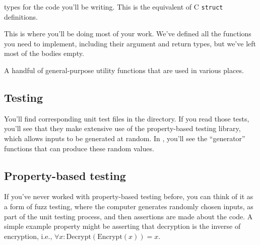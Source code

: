 \begin{description}
  types for the code you'll be writing. This is the
   equivalent
  of C {\tt struct} definitions. 
\item [\python{simple\_elections.py}\kotlin{SimpleElections.kt}] This is where you'll be doing most of
  your work. We've defined all the functions you need to implement,
  including their argument and return types, but we've left most of
  the bodies empty.
\item [\python{utils.py}\kotlin{Utilities.kt}] A handful of general-purpose utility functions that are
  used in various places.
\end{description}
  
\subsection{Testing}
You'll find corresponding unit test files in the
 directory. If you read those tests, you'll see that they
make extensive use of the  property-based testing library,
which allows inputs to be generated at random.
In
,
you'll see the ``generator'' functions
 that can produce these random values.

\subsection{Property-based testing}
If you've never worked with property-based testing before, you can
think of it as a form of fuzz testing, where the computer generates
randomly chosen inputs, as part of the unit testing process, and then
assertions are made about the code. A simple example property might be
asserting that decryption is the inverse of encryption, i.e.,
$\forall x: \mathrm{Decrypt}(\mathrm{Encrypt}(x)) = x$. 

